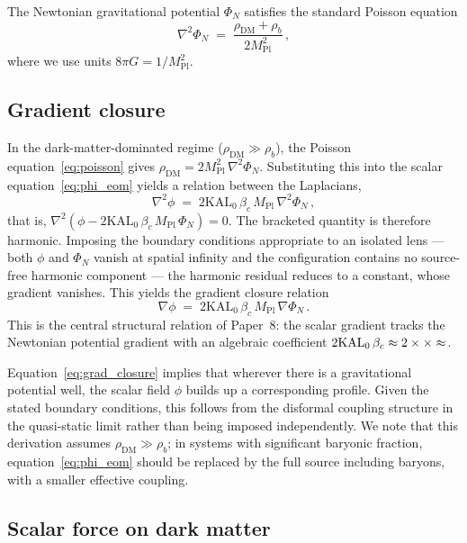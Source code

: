 \documentclass[12pt,a4paper]{article}
\newcommand{\KAL}{\mathrm{KAL}_0}
\newcommand{\Mpl}{M_{\mathrm{Pl}}}
\newcommand{\bc}{\beta_c}
\begin{document}
The Newtonian gravitational potential $\Phi_N$ satisfies the standard
Poisson equation
\begin{equation}
  \nabla^2\Phi_N \;=\; \frac{\rho_{\mathrm{DM}} + \rho_b}{2\Mpl^2}\,,
  \label{eq:poisson}
\end{equation}
where we use units $8\pi G = 1/\Mpl^2$.

\subsection{Gradient closure}

In the dark-matter-dominated regime ($\rho_{\mathrm{DM}} \gg \rho_b$),
the Poisson equation~\eqref{eq:poisson} gives
$\rho_{\mathrm{DM}} = 2\Mpl^2\,\nabla^2\Phi_N$. Substituting this into the
scalar equation~\eqref{eq:phi_eom} yields a relation between the Laplacians,
\begin{equation}
  \nabla^2\phi \;=\; 2\KAL\,\bc\,\Mpl\,\nabla^2\Phi_N\,,
  \label{eq:laplace_closure}
\end{equation}
that is, $\nabla^2\!\left(\phi - 2\KAL\,\bc\,\Mpl\,\Phi_N\right) = 0$.
The bracketed quantity is therefore harmonic. Imposing the boundary conditions
appropriate to an isolated lens --- both $\phi$ and $\Phi_N$ vanish at spatial
infinity and the configuration contains no source-free harmonic component ---
the harmonic residual reduces to a constant, whose gradient vanishes. This
yields the gradient closure relation
\begin{equation}
  \boxed{\nabla\phi \;=\; 2\KAL\,\bc\,\Mpl\,\nabla\Phi_N\,.}
  \label{eq:grad_closure}
\end{equation}
This is the central structural relation of Paper~8: the scalar gradient
tracks the Newtonian potential gradient with an algebraic coefficient
$2\KAL\,\bc \approx 2\times\val{KAL0_d3}\times\val{AURA_d3} \approx \val{p8_grad_coef}$.

Equation~\eqref{eq:grad_closure} implies that wherever there is a gravitational
potential well, the scalar field $\phi$ builds up a corresponding profile.
Given the stated boundary conditions, this follows from the disformal coupling
structure in the quasi-static limit rather than being imposed independently.
We note that this derivation assumes $\rho_{\mathrm{DM}} \gg \rho_b$; in
systems with significant baryonic fraction, equation~\eqref{eq:phi_eom}
should be replaced by the full source including baryons, with a smaller
effective coupling.

\subsection{Scalar force on dark matter}
\end{document}
